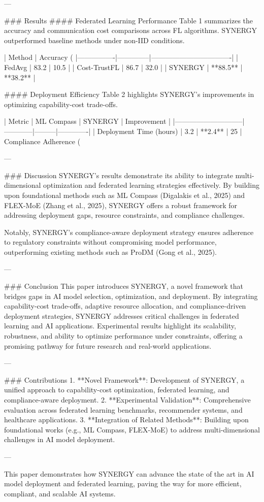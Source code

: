---

### Results  
#### Federated Learning Performance  
Table 1 summarizes the accuracy and communication cost comparisons across FL algorithms. SYNERGY outperformed baseline methods under non-IID conditions.  

| Method         | Accuracy (%
|----------------|--------------|----------------------------------|  
| FedAvg         | 83.2         | 10.5                             |  
| Cost-TrustFL   | 86.7         | 32.0                             |  
| SYNERGY        | **88.5**     | **38.2**                         |  

#### Deployment Efficiency  
Table 2 highlights SYNERGY’s improvements in optimizing capability-cost trade-offs.  

| Metric                      | ML Compass | SYNERGY | Improvement |  
|-----------------------------|------------|---------|-------------|  
| Deployment Time (hours)     | 3.2        | **2.4** | 25%
| Compliance Adherence (%

---

### Discussion  
SYNERGY’s results demonstrate its ability to integrate multi-dimensional optimization and federated learning strategies effectively. By building upon foundational methods such as ML Compass (Digalakis et al., 2025) and FLEX-MoE (Zhang et al., 2025), SYNERGY offers a robust framework for addressing deployment gaps, resource constraints, and compliance challenges.  

Notably, SYNERGY’s compliance-aware deployment strategy ensures adherence to regulatory constraints without compromising model performance, outperforming existing methods such as ProDM (Gong et al., 2025).  

---

### Conclusion  
This paper introduces SYNERGY, a novel framework that bridges gaps in AI model selection, optimization, and deployment. By integrating capability-cost trade-offs, adaptive resource allocation, and compliance-driven deployment strategies, SYNERGY addresses critical challenges in federated learning and AI applications. Experimental results highlight its scalability, robustness, and ability to optimize performance under constraints, offering a promising pathway for future research and real-world applications.  

---

### Contributions  
1. **Novel Framework**: Development of SYNERGY, a unified approach to capability-cost optimization, federated learning, and compliance-aware deployment.  
2. **Experimental Validation**: Comprehensive evaluation across federated learning benchmarks, recommender systems, and healthcare applications.  
3. **Integration of Related Methods**: Building upon foundational works (e.g., ML Compass, FLEX-MoE) to address multi-dimensional challenges in AI model deployment.  

--- 

This paper demonstrates how SYNERGY can advance the state of the art in AI model deployment and federated learning, paving the way for more efficient, compliant, and scalable AI systems.